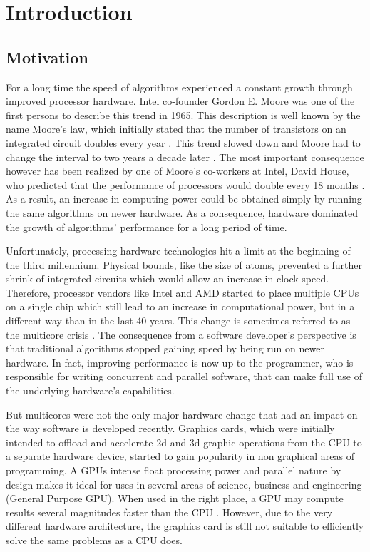 \section{Introduction}

\subsection{Motivation}

For a long time the speed of algorithms experienced a constant growth through improved processor hardware. Intel co-founder Gordon E. Moore was one of the first persons to describe this trend in 1965. This description is well known by the name Moore's law, which initially stated that the number of transistors on an integrated circuit doubles every year \cite{moore_law}. This trend slowed down and Moore had to change the interval to two years a decade later \cite{moore_law_2003}. The most important consequence however has been realized by one of Moore's co-workers at Intel, David House, who predicted that the performance of processors would double every 18 months \cite{moore_law_2003}. As a result, an increase in computing power could be obtained simply by running the same algorithms on newer hardware. As a consequence, hardware dominated the growth of algorithms' performance for a long period of time.

Unfortunately, processing hardware technologies hit a limit at the beginning of the third millennium. Physical bounds, like the size of atoms, prevented a further shrink of integrated circuits which would allow an increase in clock speed. Therefore, processor vendors like Intel and AMD started to place multiple CPUs on a single chip which still lead to an increase in computational power, but in a different way than in the last 40 years. This change is sometimes referred to as the multicore crisis \cite{multicore_crisis}. The consequence from a software developer's perspective is that traditional algorithms stopped gaining speed by being run on newer hardware. In fact, improving performance is now up to the programmer, who is responsible for writing concurrent and parallel software, that can make full use of the underlying hardware's capabilities. 

But multicores were not the only major hardware change that had an impact on the way software is developed recently. Graphics cards, which were initially intended to offload and accelerate 2d and 3d graphic operations from the CPU to a separate hardware device, started to gain popularity in non graphical areas of programming. A GPUs intense float processing power and parallel nature by design makes it ideal for uses in several areas of science, business and engineering (General Purpose GPU). When used in the right place, a GPU may compute results several magnitudes faster than the CPU \cite{gpu_history}. However, due to the very different hardware architecture, the graphics card is still not suitable to efficiently solve the same problems as a CPU does.

